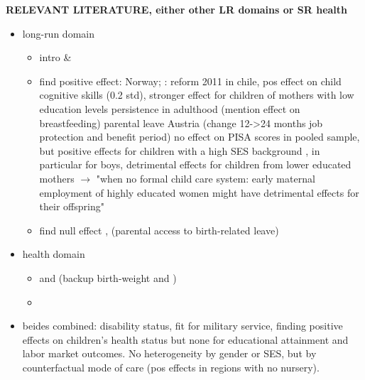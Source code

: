 \documentclass[11pt, a4paper,draft]{article} %
\begin{document}
\textbf{RELEVANT LITERATURE, either other LR domains or SR health} 
\begin{itemize}
	\item long-run domain
	\begin{itemize}
		\item intro \cite{currie2011human} \& \cite{almond2017childhood}
		\item find positive effect: \cite{carneiro2015flying} Norway; \cite{albagli2018}: reform 2011 in chile, pos effect on child cognitive skills (0.2 std), stronger effect for children of mothers with low education levels persistence in adulthood (mention effect on breastfeeding)  \cite{danzer2017} parental leave Austria (change 12->24 months job protection and benefit period) no effect on PISA scores in pooled sample, but positive effects for children with a high SES background , in particular for boys, detrimental effects for children from lower educated mothers $\rightarrow$ "when no formal  child care system: early maternal employment of highly educated women might have detrimental effects for their offspring"
		\item find null effect \cite{Dahl2016Case}, \cite{rasmussen2010increasing} (parental access to birth-related leave)
	\end{itemize}
	\item health domain
	\begin{itemize}
		\item \cite{stearns2015effects} and \cite{rossin2011effects} (backup birth-weight \cite{almond2005costs} and \cite{currie2007biology})
		\item \cite{beuchert2016}
	\end{itemize}
	\item beides combined: \cite{danzer2017parental} disability status, fit for military service, finding positive effects on children's health status but none for educational attainment and labor market outcomes. No heterogeneity by gender or SES, but by counterfactual mode of care (pos effects in regions with no nursery).
\end{itemize}
\end{document}
